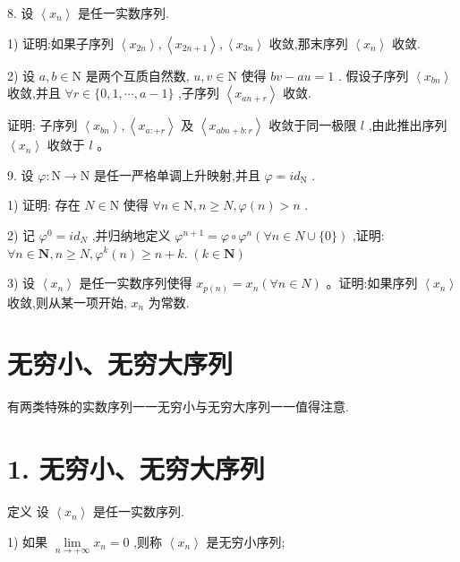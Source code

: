 8. 设 $\left\langle  {x}_{n}\right\rangle$ 是任一实数序列.

1) 证明:如果子序列 $\left\langle  {x}_{2n}\right\rangle  ,\left\langle  {x}_{{2n} + 1}\right\rangle  ,\left\langle  {x}_{3n}\right\rangle$ 收敛,那末序列 $\left\langle  {x}_{n}\right\rangle$ 收敛.

2) 设 $a,b \in  \mathrm{N}$ 是两个互质自然数, $u,v \in  \mathrm{N}$ 使得 ${bv} - {au} = 1$ . 假设子序列 $\left\langle  {x}_{bn}\right\rangle$ 收敛,并且 $\forall r \in  \{ 0,1,\cdots ,a - 1\}$ ,子序列 $\left\langle  {x}_{{an} + r}\right\rangle$ 收敛.

证明: 子序列 $\left\langle  {x}_{bn}\right\rangle  ,\left\langle  {x}_{a :  + r}\right\rangle$ 及 $\left\langle  {x}_{{abn} + b : r}\right\rangle$ 收敛于同一极限 $l$ ,由此推出序列 $\left\langle  {x}_{n}\right\rangle$ 收敛于 $l$ 。

9. 设 $\varphi  : \mathrm{N} \rightarrow  \mathrm{N}$ 是任一严格单调上升映射,并且 $\varphi  = i{d}_{\mathrm{N}}$ .

1) 证明: 存在 $N \in  \mathrm{N}$ 使得 $\forall n \in  \mathrm{N},n \geq  N,\varphi \left( n\right)  > n$ .

2) 记 ${\varphi }^{0} = i{d}_{N}$ ,并归纳地定义 ${\varphi }^{n + 1} = \varphi  \circ  {\varphi }^{n}\left( {\forall n \in  N\cup \{ 0\} }\right)$ ,证明: $\forall n \in  \mathbf{N},n \geq  N,{\varphi }^{k}\left( n\right)  \geq  n + k.\;\left( {k \in  \mathbf{N}}\right)$

3) 设 $\left\langle  {x}_{n}\right\rangle$ 是任一实数序列使得 ${x}_{p\left( n\right) } = {x}_{n}\left( {\forall n \in  N}\right)$ 。证明:如果序列 $\left\langle  {x}_{n}\right\rangle$ 收敛,则从某一项开始, ${x}_{n}$ 为常数.

\section{无穷小、无穷大序列}

有两类特殊的实数序列一一无穷小与无穷大序列一一值得注意.

\section*{1. 无穷小、无穷大序列}

定义 设 $\left\langle  {x}_{n}\right\rangle$ 是任一实数序列.

1) 如果 $\mathop{\lim }\limits_{{n \rightarrow   + \infty }}{x}_{n} = 0$ ,则称 $\left\langle  {x}_{n}\right\rangle$ 是无穷小序列;

